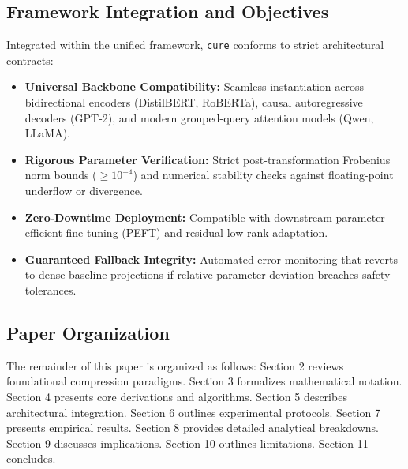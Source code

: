 \subsection{Framework Integration and Objectives}
Integrated within the unified framework, \texttt{cure} conforms to strict architectural contracts:
\begin{itemize}
\item \textbf{Universal Backbone Compatibility:} Seamless instantiation across bidirectional encoders (DistilBERT, RoBERTa), causal autoregressive decoders (GPT-2), and modern grouped-query attention models (Qwen, LLaMA).
\item \textbf{Rigorous Parameter Verification:} Strict post-transformation Frobenius norm bounds ($\ge 10^{-4}$) and numerical stability checks against floating-point underflow or divergence.
\item \textbf{Zero-Downtime Deployment:} Compatible with downstream parameter-efficient fine-tuning (PEFT) and residual low-rank adaptation.
\item \textbf{Guaranteed Fallback Integrity:} Automated error monitoring that reverts to dense baseline projections if relative parameter deviation breaches safety tolerances.
\end{itemize}

\subsection{Paper Organization}
The remainder of this paper is organized as follows: Section 2 reviews foundational compression paradigms. Section 3 formalizes mathematical notation. Section 4 presents core derivations and algorithms. Section 5 describes architectural integration. Section 6 outlines experimental protocols. Section 7 presents empirical results. Section 8 provides detailed analytical breakdowns. Section 9 discusses implications. Section 10 outlines limitations. Section 11 concludes.
